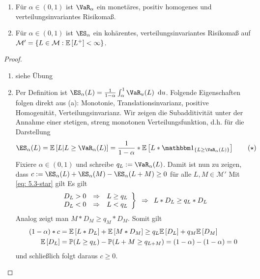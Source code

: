 \begin{theorem}
	\begin{enumerate}[label=(\alph*), nolistsep]
		\item Für $\alpha \in (0,1)$ ist $\VaR_\alpha$ ein monetäres, positiv homogenes und verteilungsinvariantes Risikomaß.
		\item Für $\alpha \in (0,1)$ ist $\ES_\alpha$ ein kohärentes, verteilungsinvariantes Risikomaß auf $\mathcal{M}' = \left\{ L \in \mathcal{M}: \mathbb{E} \left[ L^+ \right] < \infty \right\}$.
	\end{enumerate}
\end{theorem}
\begin{proof}
	\begin{enumerate}
		\item siehe Übung
		\item Per Definition ist $\ES_\alpha(L) = \frac{1}{1-\alpha} \int_\alpha^1 \VaR_u(L) \diffskip{u}$. 
		Folgende Eigenschaften folgen direkt aus (a): Monotonie, Translationsinvarianz, positive Homogenität, Verteilungsinvarianz. Wir zeigen die Subadditivität unter der Annahme einer stetigen, streng monotonen Verteilungsfunktion, d.h. für die Darstellung 
		\begin{equation*}
		\ES_\alpha(L) = \EW[L | L \ge \VaR_\alpha(L)] = \frac{1}{1-\alpha} * \EW[L * \one_{\menge{L \ge \VaR_\alpha(L)}}]
		\tag{$\star$} \label{eq: 5.3-star}
		\end{equation*}Fixiere $\alpha \in (0,1)$ und schreibe $q_L \defeq \VaR_\alpha(L)$. Damit ist nun zu zeigen, dass $c \defeq \ES_\alpha(L) + \ES_\alpha(M) - \ES_\alpha(L+M) \ge 0$ für alle $L, M \in \mathcal{M}'$
		Mit \eqref{eq: 5.3-star} gilt
	Es gilt
	\begin{equation*}
	\left. \begin{array}{rcl}
	D_L > 0 & \Rightarrow & L \ge q_L \\
	D_L < 0 & \Rightarrow & L < q_L
	\end{array}
	\right\} \enskip \Rightarrow \enskip L * D_L \ge q_L *  D_L
	\end{equation*}
	Analog zeigt man $M * D_M \ge q_M * D_M$. Somit gilt
	\begin{equation*}
	\begin{aligned}
	(1-\alpha) * c &= \mathbb{E} \left[ L * D_L \right] + \mathbb{E} \left[ M * D_M \right] \ge q_L \mathbb{E} \left[ D_L \right] + q_M \mathbb{E} \left[ D_M \right] \\
	\mathbb{E} \left[ D_L \right] &= \mathbb{P}(L \ge q_L) - \mathbb{P}(L+M \ge q_{L+M}) = (1-\alpha) - (1-\alpha) = 0
	\end{aligned}
	\end{equation*}
	und schließlich folgt daraus $c \ge 0$.
\end{enumerate}
\end{proof}

